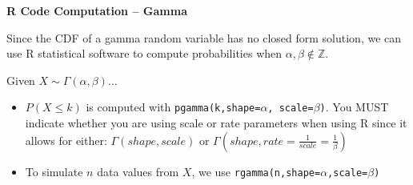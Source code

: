 \textbf{R Code Computation -- Gamma} 

Since the CDF of a gamma random variable has no closed form solution, we can use R statistical software to compute probabilities when $\alpha, \beta \notin \mathbb{Z}$. 

Given $X \sim \Gamma(\alpha, \beta) \dots$

\begin{itemize}
    \item $P (X \le k)$ is computed with \texttt{pgamma(k,shape=$\alpha$, scale=$\beta$)}. You MUST indicate whether you are using scale or rate parameters when using R since it allows for either: $\Gamma(shape, scale)$ or $\Gamma(shape, rate = \frac{1}{scale} = \frac{1}{\beta})$
    \item To simulate $n$ data values from $X$, we use \texttt{rgamma(n,shape=$\alpha$,scale=$\beta$)}
\end{itemize}

